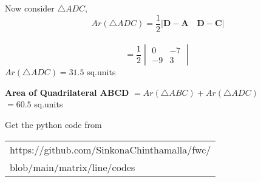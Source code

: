 \documentclass[journal,12pt,twocolumn]{IEEEtran}
\let\vec\mathbf
\begin{document}
\vspace{0.6cm}
\raggedright 
Now consider $ \triangle ADC, $
\vspace{0.2cm}
\begin{equation}
Ar(\triangle ADC)= \frac{1}{2}|\vec{D-A} \quad \vec{D-C}| 
\end{equation}
\vspace{0.2cm}\\
\unboldmath
\begin{equation}
= \frac{1}{2} \begin{vmatrix}
                    0 & -7\\
                   -9 &  3
                   \end{vmatrix} 
\end{equation}
$ Ar(\triangle ADC)= 31.5 $ sq.units
\boldmath
\vspace{0.2cm}

\textbf{Area of Quadrilateral ABCD} 
$= Ar(\triangle ABC)+Ar(\triangle ADC) $
\unboldmath
\vspace{0.2cm}
\\$ = 60.5 $ sq.units

\vspace{1cm}
Get the python code from
\begin{table}[h]
\large
\centering
\begin{tabular}{|l|}
\hline
https://github.com/SinkonaChinthamalla/fwc/
\\blob/main/matrix/line/codes \\
\hline
\end{tabular}
\end{table}	
\end{document}
